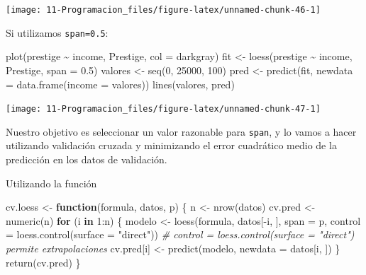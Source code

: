\documentclass[
]{book}
\newenvironment{Shaded}{\begin{snugshade}}{\end{snugshade}}
\newcommand{\AttributeTok}[1]{\textcolor[rgb]{0.77,0.63,0.00}{#1}}
\newcommand{\CommentTok}[1]{\textcolor[rgb]{0.56,0.35,0.01}{\textit{#1}}}
\newcommand{\ControlFlowTok}[1]{\textcolor[rgb]{0.13,0.29,0.53}{\textbf{#1}}}
\newcommand{\DecValTok}[1]{\textcolor[rgb]{0.00,0.00,0.81}{#1}}
\newcommand{\FloatTok}[1]{\textcolor[rgb]{0.00,0.00,0.81}{#1}}
\newcommand{\FunctionTok}[1]{\textcolor[rgb]{0.00,0.00,0.00}{#1}}
\newcommand{\NormalTok}[1]{#1}
\newcommand{\OtherTok}[1]{\textcolor[rgb]{0.56,0.35,0.01}{#1}}
\newcommand{\SpecialCharTok}[1]{\textcolor[rgb]{0.00,0.00,0.00}{#1}}
\newcommand{\StringTok}[1]{\textcolor[rgb]{0.31,0.60,0.02}{#1}}
\theoremstyle{break}
\begin{document}
\begin{center}\texttt{[image: 11-Programacion\_files/figure-latex/unnamed-chunk-46-1]} \end{center}

Si utilizamos \texttt{span=0.5}:

\begin{Shaded}
\begin{Highlighting}[]
\FunctionTok{plot}\NormalTok{(prestige }\SpecialCharTok{\textasciitilde{}}\NormalTok{ income, Prestige, }\AttributeTok{col =} \StringTok{\textquotesingle{}darkgray\textquotesingle{}}\NormalTok{)}
\NormalTok{fit }\OtherTok{\textless{}{-}} \FunctionTok{loess}\NormalTok{(prestige }\SpecialCharTok{\textasciitilde{}}\NormalTok{ income, Prestige, }\AttributeTok{span =} \FloatTok{0.5}\NormalTok{)}
\NormalTok{valores }\OtherTok{\textless{}{-}} \FunctionTok{seq}\NormalTok{(}\DecValTok{0}\NormalTok{, }\DecValTok{25000}\NormalTok{, }\DecValTok{100}\NormalTok{)}
\NormalTok{pred }\OtherTok{\textless{}{-}} \FunctionTok{predict}\NormalTok{(fit, }\AttributeTok{newdata =} \FunctionTok{data.frame}\NormalTok{(}\AttributeTok{income =}\NormalTok{ valores))}
\FunctionTok{lines}\NormalTok{(valores, pred)}
\end{Highlighting}
\end{Shaded}

\begin{center}\texttt{[image: 11-Programacion\_files/figure-latex/unnamed-chunk-47-1]} \end{center}

Nuestro objetivo es seleccionar un valor razonable para \texttt{span}, y lo vamos a
hacer utilizando validación cruzada y minimizando el error cuadrático medio
de la predicción en los datos de validación.

Utilizando la función

\begin{Shaded}
\begin{Highlighting}[]
\NormalTok{cv.loess }\OtherTok{\textless{}{-}} \ControlFlowTok{function}\NormalTok{(formula, datos, p) \{}
\NormalTok{  n }\OtherTok{\textless{}{-}} \FunctionTok{nrow}\NormalTok{(datos)}
\NormalTok{  cv.pred }\OtherTok{\textless{}{-}} \FunctionTok{numeric}\NormalTok{(n)}
  \ControlFlowTok{for}\NormalTok{ (i }\ControlFlowTok{in} \DecValTok{1}\SpecialCharTok{:}\NormalTok{n) \{}
\NormalTok{    modelo }\OtherTok{\textless{}{-}} \FunctionTok{loess}\NormalTok{(formula, datos[}\SpecialCharTok{{-}}\NormalTok{i, ], }\AttributeTok{span =}\NormalTok{ p, }
                    \AttributeTok{control =} \FunctionTok{loess.control}\NormalTok{(}\AttributeTok{surface =} \StringTok{"direct"}\NormalTok{))}
    \CommentTok{\# control = loess.control(surface = "direct") permite extrapolaciones}
\NormalTok{    cv.pred[i] }\OtherTok{\textless{}{-}} \FunctionTok{predict}\NormalTok{(modelo, }\AttributeTok{newdata =}\NormalTok{ datos[i, ])}
\NormalTok{  \}}
  \FunctionTok{return}\NormalTok{(cv.pred)}
\NormalTok{\}}
\end{Highlighting}
\end{Shaded}
\end{document}
